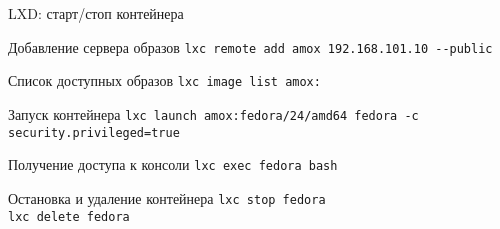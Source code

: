 \begin{frame}{LXD: старт/стоп контейнера}
	\begin{block}{Добавление сервера образов}
		{\tt lxc remote add amox 192.168.101.10 -{}-public}
	\end{block}
	\begin{block}{Список доступных образов}
		{\tt lxc image list amox: }
	\end{block}
	\begin{block}{Запуск контейнера}
		{\tt lxc launch amox:fedora/24/amd64 fedora -c security.privileged=true }
	\end{block}
	\begin{block}{Получение доступа к консоли}
		{\tt lxc exec fedora bash }
	\end{block}

	\begin{block}{Остановка и удаление контейнера}
		{\tt lxc stop fedora}\\
		{\tt lxc delete fedora}
	\end{block}
\end{frame}

